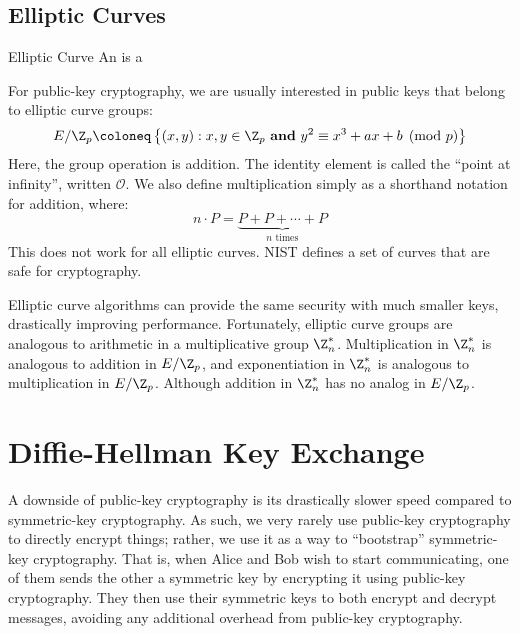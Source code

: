 

\subsection{Elliptic Curves}

\begin{dfnbox}{Elliptic Curve}{}
    An  is a 
\end{dfnbox}

For public-key cryptography, we are usually interested in public keys that belong to elliptic curve groups:
\[ E / \Z_p \coloneq \left\{ (x,y) : x,y \in \Z_p\ \textbf{and}\ y^2 \equiv x^3 + ax + b \pmod{p} \right\} \]
Here, the group operation is addition. The identity element is called the ``point at infinity'', written $\mathcal{O}$. We also define multiplication simply as a shorthand notation for addition, where:
\[ n \cdot P = \underbrace{P + P + \cdots + P}_\text{$n$ times} \]
This does not work for all elliptic curves. NIST defines a set of curves that are safe for cryptography.


Elliptic curve algorithms can provide the same security with much smaller keys, drastically improving performance. Fortunately, elliptic curve groups are analogous to arithmetic in a multiplicative group $\Z_n^*$. Multiplication in $\Z_n^*$ is analogous to addition in $E/\Z_p$, and exponentiation in $\Z_n^*$ is analogous to multiplication in $E/\Z_p$. Although addition in $\Z_n^*$ has no analog in $E/\Z_p$.

\section{Diffie-Hellman Key Exchange}

A downside of public-key cryptography is its drastically slower speed compared to symmetric-key cryptography. As such, we very rarely use public-key cryptography to directly encrypt things; rather, we use it as a way to ``bootstrap'' symmetric-key cryptography. That is, when Alice and Bob wish to start communicating, one of them sends the other a symmetric key by encrypting it using public-key cryptography. They then use their symmetric keys to both encrypt and decrypt messages, avoiding any additional overhead from public-key cryptography.

